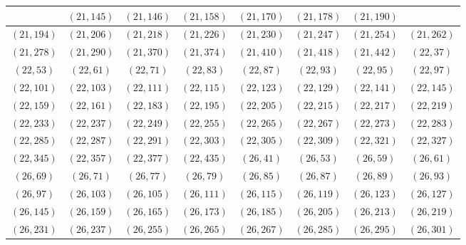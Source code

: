 \documentclass[11pt,reqno]{amsart}
\theoremstyle{definition}
\begin{document}
\begin{longtable}{|c|c|c|c|c|c|c|c|}
 & 
$ ( 21 , 145 )$
 & 
$ ( 21 , 146 )$
 & 
$ ( 21 , 158 )$
 & 
$ ( 21 , 170 )$
 & 
$ ( 21 , 178 )$
 & 
$ ( 21 , 190 )$
\\ \hline
$ ( 21 , 194 )$
 & 
$ ( 21 , 206 )$
 & 
$ ( 21 , 218 )$
 & 
$ ( 21 , 226 )$
 & 
$ ( 21 , 230 )$
 & 
$ ( 21 , 247 )$
 & 
$ ( 21 , 254 )$
 & 
$ ( 21 , 262 )$
\\ \hline
$ ( 21 , 278 )$
 & 
$ ( 21 , 290 )$
 & 
$ ( 21 , 370 )$
 & 
$ ( 21 , 374 )$
 & 
$ ( 21 , 410 )$
 & 
$ ( 21 , 418 )$
 & 
$ ( 21 , 442 )$
 & 
$ ( 22 , 37 )$
\\ \hline
$ ( 22 , 53 )$
 & 
$ ( 22 , 61 )$
 & 
$ ( 22 , 71 )$
 & 
$ ( 22 , 83 )$
 & 
$ ( 22 , 87 )$
 & 
$ ( 22 , 93 )$
 & 
$ ( 22 , 95 )$
 & 
$ ( 22 , 97 )$
\\ \hline
$ ( 22 , 101 )$
 & 
$ ( 22 , 103 )$
 & 
$ ( 22 , 111 )$
 & 
$ ( 22 , 115 )$
 & 
$ ( 22 , 123 )$
 & 
$ ( 22 , 129 )$
 & 
$ ( 22 , 141 )$
 & 
$ ( 22 , 145 )$
\\ \hline
$ ( 22 , 159 )$
 & 
$ ( 22 , 161 )$
 & 
$ ( 22 , 183 )$
 & 
$ ( 22 , 195 )$
 & 
$ ( 22 , 205 )$
 & 
$ ( 22 , 215 )$
 & 
$ ( 22 , 217 )$
 & 
$ ( 22 , 219 )$
\\ \hline
$ ( 22 , 233 )$
 & 
$ ( 22 , 237 )$
 & 
$ ( 22 , 249 )$
 & 
$ ( 22 , 255 )$
 & 
$ ( 22 , 265 )$
 & 
$ ( 22 , 267 )$
 & 
$ ( 22 , 273 )$
 & 
$ ( 22 , 283 )$
\\ \hline
$ ( 22 , 285 )$
 & 
$ ( 22 , 287 )$
 & 
$ ( 22 , 291 )$
 & 
$ ( 22 , 303 )$
 & 
$ ( 22 , 305 )$
 & 
$ ( 22 , 309 )$
 & 
$ ( 22 , 321 )$
 & 
$ ( 22 , 327 )$
\\ \hline
$ ( 22 , 345 )$
 & 
$ ( 22 , 357 )$
 & 
$ ( 22 , 377 )$
 & 
$ ( 22 , 435 )$
 & 
$ ( 26 , 41 )$
 & 
$ ( 26 , 53 )$
 & 
$ ( 26 , 59 )$
 & 
$ ( 26 , 61 )$
\\ \hline
$ ( 26 , 69 )$
 & 
$ ( 26 , 71 )$
 & 
$ ( 26 , 77 )$
 & 
$ ( 26 , 79 )$
 & 
$ ( 26 , 85 )$
 & 
$ ( 26 , 87 )$
 & 
$ ( 26 , 89 )$
 & 
$ ( 26 , 93 )$
\\ \hline
$ ( 26 , 97 )$
 & 
$ ( 26 , 103 )$
 & 
$ ( 26 , 105 )$
 & 
$ ( 26 , 111 )$
 & 
$ ( 26 , 115 )$
 & 
$ ( 26 , 119 )$
 & 
$ ( 26 , 123 )$
 & 
$ ( 26 , 127 )$
\\ \hline
$ ( 26 , 145 )$
 & 
$ ( 26 , 159 )$
 & 
$ ( 26 , 165 )$
 & 
$ ( 26 , 173 )$
 & 
$ ( 26 , 185 )$
 & 
$ ( 26 , 205 )$
 & 
$ ( 26 , 213 )$
 & 
$ ( 26 , 219 )$
\\ \hline
$ ( 26 , 231 )$
 & 
$ ( 26 , 237 )$
 & 
$ ( 26 , 255 )$
 & 
$ ( 26 , 265 )$
 & 
$ ( 26 , 267 )$
 & 
$ ( 26 , 285 )$
 & 
$ ( 26 , 295 )$
 & 
$ ( 26 , 301 )$
\\ \hline

\end{longtable}
\end{document}
